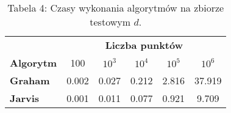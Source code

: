 \begin{table}[!ht]
    \centering
\begin{tabular}{l  c|c|c|c|c|}
    & \multicolumn{5}{c}{\textbf{Liczba punktów}} \\ \cline{2-6}     
    \multicolumn{1}{l|}{\textbf{Algorytm}} & 100& $10^3$& $10^4$& $10^5$& $10^6$ \\
   \hline
   \hline
   \multicolumn{1}{l|}{\textbf{Graham}} & 0.002& 0.027& 0.212& 2.816& 37.919 \\
   \hline
   \multicolumn{1}{l|}{\textbf{Jarvis}} & 0.001& 0.011& 0.077& 0.921& 9.709 \\
   \cline{2-6}
\end{tabular}
\caption*{Tabela 4: Czasy wykonania algorytmów na zbiorze testowym $d$.}
\end{table}